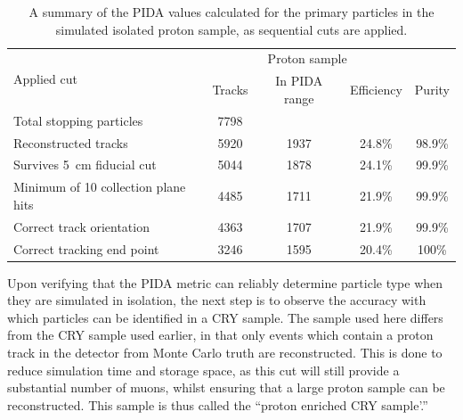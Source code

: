 \begin{table}
  \caption[A summary of the PIDA values calculated for the primary particles in the simulated isolated proton sample, as sequential cuts are applied]
          {A summary of the PIDA values calculated for the primary particles in the simulated isolated proton sample, as sequential cuts are applied.}
  \centering
  \label{tab:Isol_PIDA_PrimProton}
  \begin{tabular}{l c c c c}
    \toprule
    \multirow{2}{*}{Applied cut} & \multicolumn{3}{c}{Proton sample} \\ 
    \cmidrule{2-5}
      & Tracks & In PIDA range & Efficiency & Purity \\ 
    \midrule
      Total stopping particles            & 7798 &      &        & \\

      Reconstructed tracks                & 5920 & 1937 & 24.8\% & 98.9\% \\

      Survives 5~cm fiducial cut          & 5044 & 1878 & 24.1\% & 99.9\% \\

      Minimum of 10 collection plane hits & 4485 & 1711 & 21.9\% & 99.9\% \\

      Correct track orientation           & 4363 & 1707 & 21.9\% & 99.9\% \\

      Correct tracking end point          & 3246 & 1595 & 20.4\% & 100\%  \\
    \bottomrule
  \end{tabular}
\end{table}

Upon verifying that the PIDA metric can reliably determine particle type when they are simulated in isolation, the next step is to observe the accuracy with which particles can be identified in a CRY sample. The sample used here differs from the CRY sample used earlier, in that only events which contain a proton track in the detector from Monte Carlo truth are reconstructed. This is done to reduce simulation time and storage space, as this cut will still provide a substantial number of muons, whilst ensuring that a large proton sample can be reconstructed. This sample is thus called the ``proton enriched CRY sample'.'' \\

